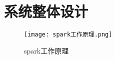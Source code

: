 


\section{系统整体设计}


\begin{figure}
    \centering
    \texttt{[image: spark工作原理.png]}
    \caption{spark工作原理}
    \label{fig:spark工作原理}
  \end{figure}



